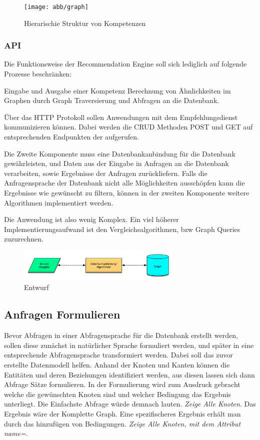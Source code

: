 \begin{figure}[htb]
 \centering
 \texttt{[image: abb/graph]}
 \caption[Beschreibung]{Hierarischie Struktur von Kompetenzen}
\label{fig:Beschreibung}
\end{figure}

\subsubsection{API}

 Die Funktionsweise der Recommendation Engine soll sich lediglich auf folgende Prozesse beschränken:
 
 Eingabe und Ausgabe einer Kompetenz
Berechnung von Ähnlichkeiten im Graphen durch Graph Traversierung und Abfragen an die Datenbank.

Über das HTTP Protokoll sollen Anwendungen mit dem Empfehlungsdienst kommunizieren können. Dabei werden die CRUD Methoden POST und GET auf entsprechenden Endpunkten der aufgerufen. 

Die Zweite Komponente muss eine Datenbankanbindung für die Datenbank gewährleisten, und Daten aus der Eingabe in Anfragen an die Datenbank verarbeiten, sowie Ergebnisse der Anfragen zurückliefern. Falls die Anfragensprache der Datenbank nicht alle Möglichkeiten ausschöpfen kann die Ergebnisse wie gewünscht zu filtern, können in der zweiten Komponente weitere Algorithmen implementiert werden.

Die Anwendung ist also wenig Komplex. Ein viel höherer Implementierungsaufwand ist den Vergleichsalgorithmen, bzw Graph Queries zuzurechnen. 

\begin{figure}[htb]
 \centering
 \includegraphics[width=0.7\textwidth,angle=0]{abb/entwurf}
 \caption[Beschreibung]{Entwurf}
\label{fig:Entwurf}
\end{figure}



\subsection{Anfragen Formulieren}

Bevor Abfragen in einer Abfragensprache für die Datenbank erstellt werden, sollen diese zunächst in natürlicher Sprache formuliert werden, und später in eine entsprechende Abfragensprache  transformiert werden. Dabei soll das zuvor erstellte  Datenmodell helfen. Anhand der Knoten und Kanten können die Entitäten und deren Beziehungen identifiziert werden, aus diesen lassen sich dann Abfrage Sätze formulieren. In der Formulierung wird zum Ausdruck gebracht welche die gewünschten Knoten sind und welcher Bedingung das Ergebnis unterliegt. Die Einfachste Abfrage würde demnach lauten. \textit{Zeige Alle Knoten}. Das Ergebnis wäre der Komplette Graph. Eine spezifischeres Ergebnis erhält man durch das hinzufügen von Bedingungen. \textit{  Zeige Alle Knoten, mit dem Attribut {name=\textbf{\texttt{}}}}. 


